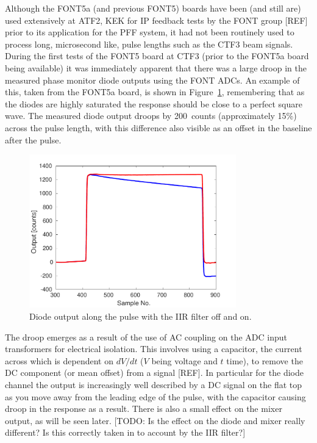 Although the FONT5a (and previous FONT5) boards have been (and still are) used extensively at ATF2, KEK for IP feedback tests by the FONT group [REF] prior to its application for the PFF system, it had not been routinely used to process long, microsecond like, pulse lengths such as the CTF3 beam signals. During the first tests of the FONT5 board at CTF3 (prior to the FONT5a board being available) it was immediately apparent that there was a large droop in the measured phase monitor diode outputs using the FONT ADCs. An example of this, taken from the FONT5a board, is shown in Figure~\ref{f:iirDiodefiltOffOn}, remembering that as the diodes are highly saturated the response should be close to a perfect square wave. The measured diode output droops by 200~counts (approximately 15\%) across the pulse length, with this difference also visible as an offset in the baseline after the pulse.

\begin{figure}
  \centering
  \includegraphics[width=0.8\textwidth]{Figures/commissioning/iirDiodeFiltOffOn}
  \caption{Diode output along the pulse with the IIR filter off and on.}
  \label{f:iirDiodefiltOffOn}
\end{figure}

The droop emerges as a result of the use of AC coupling on the ADC input transformers for electrical isolation. This involves using a capacitor, the current across which is dependent on \({dV}/{dt}\) (\(V\) being voltage and \(t\) time), to remove the DC component (or mean offset) from a signal [REF]. In particular for the diode channel the output is increasingly well described by a DC signal on the flat top as you move away from the leading edge of the pulse, with the capacitor causing droop in the response as a result. There is also a small effect on the mixer output, as will be seen later. [TODO: Is the effect on the diode and mixer really different? Is this correctly taken in to account by the IIR filter?]

